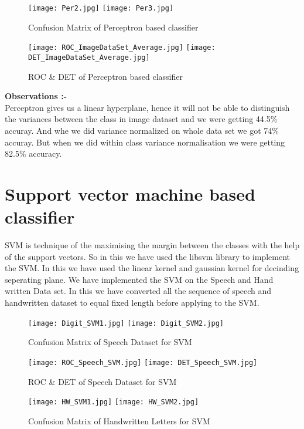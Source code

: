 \documentclass[12pt]{report}
\begin{document}
\begin{figure}[H]
	\centering
	\texttt{[image: Per2.jpg]}
	\texttt{[image: Per3.jpg]}
	\caption{Confusion Matrix of Perceptron based classifier}
\end{figure}

\begin{figure}[H]

	\texttt{[image: ROC\_ImageDataSet\_Average.jpg]}
	\texttt{[image: DET\_ImageDataSet\_Average.jpg]}
	\caption{ROC \& DET  of Perceptron based classifier}
\end{figure}

\noindent
{\bfseries Observations :-}\\
Perceptron gives us a linear hyperplane, hence it will not be able to distinguish the variances between the class in image dataset and we were getting 44.5$ \% $ accuray. And whe we did variance normalized on whole data set we got 74$ \% $ accuray. But when we did within class variance normalisation we were getting 82.5$ \% $ accuracy.


\section{Support vector machine based classifier}
SVM  is technique of the maximising the margin between the classes with the help of the support vectors. So in this we have used the libsvm library to implement the SVM. In this we have used the linear kernel and gaussian kernel for decinding seperating plane. We have implemented the SVM on the Speech and Hand written Data set. In this we have converted all the sequence of speech and handwritten dataset to equal fixed length before applying to the SVM.\\


\begin{figure}[H]
	\centering
		\texttt{[image: Digit\_SVM1.jpg]}
		\texttt{[image: Digit\_SVM2.jpg]}
	\caption{Confusion Matrix of Speech Dataset for SVM}
\end{figure}

\begin{figure}[H]
	\centering
	\texttt{[image: ROC\_Speech\_SVM.jpg]}
	\texttt{[image: DET\_Speech\_SVM.jpg]}
	\caption{ROC \& DET  of Speech Dataset for SVM}
\end{figure}


\begin{figure}[H]
	\centering
	\texttt{[image: HW\_SVM1.jpg]}
	\texttt{[image: HW\_SVM2.jpg]}
	\caption{Confusion Matrix of Handwritten Letters for SVM}
\end{figure}
\end{document}
